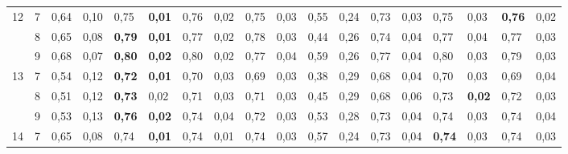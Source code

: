 \documentclass[conference]{IEEEtran}
\begin{document}
\begin{table}[]
\begin{tabular}{|cl|ll|ll|ll|ll|ll|ll|ll|ll|}
		\multicolumn{1}{|c|}{\multirow{3}{*}{12}} & 7 & \multicolumn{1}{l|}{0,64} & 0,10 & \multicolumn{1}{l|}{0,75} & \textbf{0,01} & \multicolumn{1}{l|}{0,76} & 0,02 & \multicolumn{1}{l|}{0,75} & 0,03 & \multicolumn{1}{l|}{0,55} & 0,24 & \multicolumn{1}{l|}{0,73} & 0,03 & \multicolumn{1}{l|}{0,75} & 0,03 & \multicolumn{1}{l|}{\textbf{0,76}} & 0,02 \\ \cline{2-18} 
		\multicolumn{1}{|c|}{} & 8 & \multicolumn{1}{l|}{0,65} & 0,08 & \multicolumn{1}{l|}{\textbf{0,79}} & \textbf{0,01} & \multicolumn{1}{l|}{0,77} & 0,02 & \multicolumn{1}{l|}{0,78} & 0,03 & \multicolumn{1}{l|}{0,44} & 0,26 & \multicolumn{1}{l|}{0,74} & 0,04 & \multicolumn{1}{l|}{0,77} & 0,04 & \multicolumn{1}{l|}{0,77} & 0,03 \\ \cline{2-18} 
		\multicolumn{1}{|c|}{} & 9 & \multicolumn{1}{l|}{0,68} & 0,07 & \multicolumn{1}{l|}{\textbf{0,80}} & \textbf{0,02} & \multicolumn{1}{l|}{0,80} & 0,02 & \multicolumn{1}{l|}{0,77} & 0,04 & \multicolumn{1}{l|}{0,59} & 0,26 & \multicolumn{1}{l|}{0,77} & 0,04 & \multicolumn{1}{l|}{0,80} & 0,03 & \multicolumn{1}{l|}{0,79} & 0,03 \\ \hline
		\multicolumn{1}{|c|}{\multirow{3}{*}{13}} & 7 & \multicolumn{1}{l|}{0,54} & 0,12 & \multicolumn{1}{l|}{\textbf{0,72}} & \textbf{0,01} & \multicolumn{1}{l|}{0,70} & 0,03 & \multicolumn{1}{l|}{0,69} & 0,03 & \multicolumn{1}{l|}{0,38} & 0,29 & \multicolumn{1}{l|}{0,68} & 0,04 & \multicolumn{1}{l|}{0,70} & 0,03 & \multicolumn{1}{l|}{0,69} & 0,04 \\ \cline{2-18} 
		\multicolumn{1}{|c|}{} & 8 & \multicolumn{1}{l|}{0,51} & 0,12 & \multicolumn{1}{l|}{\textbf{0,73}} & 0,02 & \multicolumn{1}{l|}{0,71} & 0,03 & \multicolumn{1}{l|}{0,71} & 0,03 & \multicolumn{1}{l|}{0,45} & 0,29 & \multicolumn{1}{l|}{0,68} & 0,06 & \multicolumn{1}{l|}{0,73} & \textbf{0,02} & \multicolumn{1}{l|}{0,72} & 0,03 \\ \cline{2-18} 
		\multicolumn{1}{|c|}{} & 9 & \multicolumn{1}{l|}{0,53} & 0,13 & \multicolumn{1}{l|}{\textbf{0,76}} & \textbf{0,02} & \multicolumn{1}{l|}{0,74} & 0,04 & \multicolumn{1}{l|}{0,72} & 0,03 & \multicolumn{1}{l|}{0,53} & 0,28 & \multicolumn{1}{l|}{0,73} & 0,04 & \multicolumn{1}{l|}{0,74} & 0,03 & \multicolumn{1}{l|}{0,74} & 0,04 \\ \hline
		\multicolumn{1}{|c|}{\multirow{3}{*}{14}} & 7 & \multicolumn{1}{l|}{0,65} & 0,08 & \multicolumn{1}{l|}{0,74} & \textbf{0,01} & \multicolumn{1}{l|}{0,74} & 0,01 & \multicolumn{1}{l|}{0,74} & 0,03 & \multicolumn{1}{l|}{0,57} & 0,24 & \multicolumn{1}{l|}{0,73} & 0,04 & \multicolumn{1}{l|}{\textbf{0,74}} & 0,03 & \multicolumn{1}{l|}{0,74} & 0,03 \\ \cline{2-18} 

\end{tabular}
\end{table}
\end{document}
